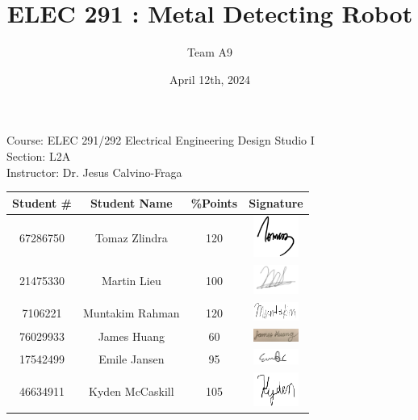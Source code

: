 \documentclass{article}
\title{ELEC 291 : Metal Detecting Robot}
\author{Team A9}
\date{April 12th, 2024}
\begin{document}
\maketitle
\begin{center}
Course: ELEC 291/292 Electrical Engineering Design Studio I \\
Section: L2A \\
Instructor: Dr. Jesus Calvino-Fraga \\
\end{center}

\begin{center}
\begin{tabular}{|c|c|c|c|}
    \hline
    Student \# & Student Name & \%Points & Signature \\
    \hline
    67286750 & Tomaz Zlindra & 120 & \includegraphics[width = 1.5cm]{Names/Tomaz.jpeg}  \\
    \hline
    21475330 & Martin Lieu & 100 &
    \includegraphics[width=1.5cm]{Names/Martin.png} \\
    \hline
    7106221 & Muntakim Rahman & 120 & \includegraphics[width=1.5cm]{Names/Muntakim.png} \\
    \hline
    76029933 & James Huang & 60 & \includegraphics[width = 1.5cm]{Names/James.jpeg}\\
    \hline
    17542499 & Emile Jansen  & 95 & \includegraphics[width = 1.5cm]{Names/Emile.png} \\
    \hline
    46634911 & Kyden McCaskill & 105 & \includegraphics[width=1.5cm]{Names/Kyden.png}\\
    \hline
\end{tabular}
\end{center}
\end{document}

